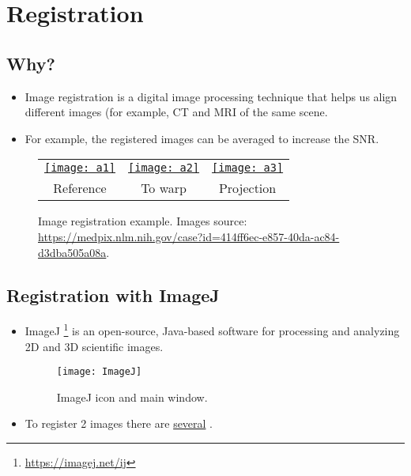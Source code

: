 \chapter{Registration}

\section{Why?}
\begin{itemize}
\item Image registration \cite{Oliveira25012014} is a digital image
  processing technique that helps us align different images (for
  example, \gls{CT} and \gls{MRI} of the same scene.
\item For example, the registered images can be averaged to increase
  the \gls{SNR}.
\end{itemize}

\begin{figure}[H]
  \vspace{-0ex}
  \centering
  \begin{tabular}{ccc}
    \href{https://d2rfm59k9u0hrr.cloudfront.net/medpix/img/full/synpic50411.jpg}{\texttt{[image: a1]}} & \href{https://d2rfm59k9u0hrr.cloudfront.net/medpix/img/full/synpic50412.jpg}{\texttt{[image: a2]}} & \href{sec:ImageJ_registration}{\texttt{[image: a3]}} \\
    Reference & To warp & Projection
  \end{tabular}
  \caption[Image registration example.]{Image registration
    example. Images source:
    \url{https://medpix.nlm.nih.gov/case?id=414ff6ec-e857-40da-ac84-d3dba505a08a}.}
  \label{fig:image_registration}
\end{figure}

\section{Registration with ImageJ}
\label{sec:ImageJ_registration}
\begin{itemize}
  \item ImageJ
    \cite{abramoff2004image}\footnote{\url{https://imagej.net/ij}} is
    an open-source, Java-based software for processing and analyzing
    2D and 3D scientific images.
\begin{figure}[H]
  \vspace{-0ex}
  \centering
  \texttt{[image: ImageJ]}
  \caption{ImageJ icon and main window.}
  \label{fig:ImageJ}
\end{figure}
  \item To register 2 images there are
    \href{https://imagej.net/imaging/registration}{several}
    .
\end{itemize}

